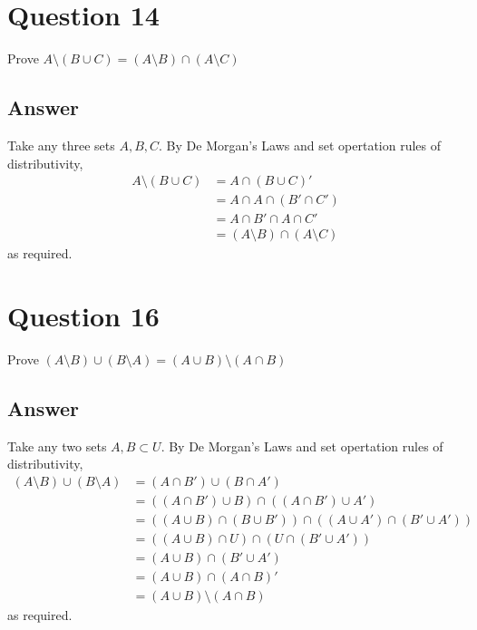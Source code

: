 \documentclass[
	12pt, %
]{fphw}
\newcommand\qed{\text{$\blacksquare$}}
\begin{document}
\section*{Question 14}

\begin{problem}
Prove $A \setminus (B \cup C) = (A \setminus B) \cap (A \setminus C)$
\end{problem}


\subsection*{Answer}
 Take any three sets $A, B, C$.  By De Morgan's Laws and set opertation rules of distributivity,
\begin{align*}
A \setminus (B \cup C) &= A \cap (B \cup C)'\\
&= A \cap A \cap (B' \cap C')\\
&= A \cap B' \cap A \cap C'\\
&= (A \setminus B) \cap (A \setminus C)
\end{align*}
as required. \qed

\newpage


\section*{Question 16}

\begin{problem}
Prove $(A \setminus B) \cup (B \setminus A) = (A \cup B) \setminus (A \cap B)$
\end{problem}


\subsection*{Answer}
Take any two sets $A, B \subset U$. By De Morgan's Laws and set opertation rules of distributivity,
\begin{align*}
(A \setminus B) \cup (B \setminus A) &= (A \cap B') \cup (B \cap A')\\
&= ((A \cap B') \cup B) \cap ((A \cap B') \cup A')\\
&= ((A \cup B) \cap (B \cup B')) \cap ((A \cup A') \cap (B' \cup A'))\\
&= ((A \cup B) \cap U) \cap (U \cap (B' \cup A'))\\
&=(A \cup B) \cap (B' \cup A')\\
&= (A \cup B) \cap (A \cap B)'\\
&= (A \cup B) \setminus (A \cap B)
\end{align*}
as required. \qed
\end{document}
